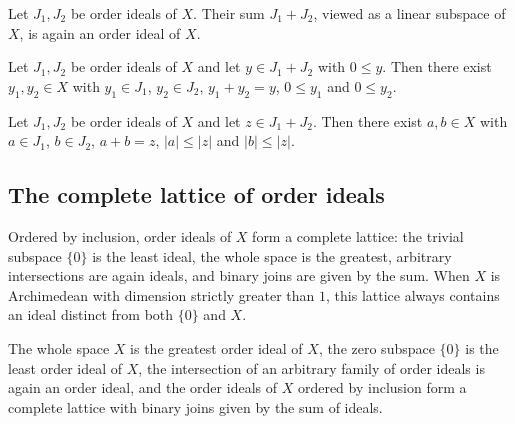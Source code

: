 \begin{lemma}
\label{lem:orderIdeal-sum}
\leanok
{}
Let $J_1, J_2$ be order ideals of $X$. Their sum $J_1 + J_2$, viewed
as a linear subspace of $X$, is again an order ideal of $X$.
\end{lemma}

\begin{theorem}
\label{thm:orderIdeal-exists-sum-decomp-nonneg}
\leanok
{}
Let $J_1, J_2$ be order ideals of $X$ and let $y \in J_1 + J_2$ with
$0 \le y$. Then there exist $y_1, y_2 \in X$ with $y_1 \in J_1$,
$y_2 \in J_2$, $y_1 + y_2 = y$, $0 \le y_1$ and $0 \le y_2$.
\end{theorem}

\begin{theorem}
\label{thm:orderIdeal-exists-sum-decomp}
\leanok
{}
Let $J_1, J_2$ be order ideals of $X$ and let $z \in J_1 + J_2$.
Then there exist $a, b \in X$ with $a \in J_1$, $b \in J_2$,
$a + b = z$, $\lvert a \rvert \le \lvert z \rvert$ and
$\lvert b \rvert \le \lvert z \rvert$.
\end{theorem}

\subsection{The complete lattice of order ideals}

Ordered by inclusion, order ideals of $X$ form a complete lattice:
the trivial subspace $\{0\}$ is the least ideal, the whole space is
the greatest, arbitrary intersections are again ideals, and binary
joins are given by the sum. When $X$ is Archimedean with dimension strictly greater than $1$,
this lattice always contains an ideal distinct from both $\{0\}$ and
$X$.

\begin{lemma}
\label{lem:orderIdeal-complete-lattice}
\leanok
{}
The whole space $X$ is the greatest order ideal of $X$, the zero
subspace $\{0\}$ is the least order ideal of $X$, the intersection
of an arbitrary family of order ideals is again an order ideal, and
the order ideals of $X$ ordered by inclusion form a complete lattice
with binary joins given by the sum of ideals.
\end{lemma}

